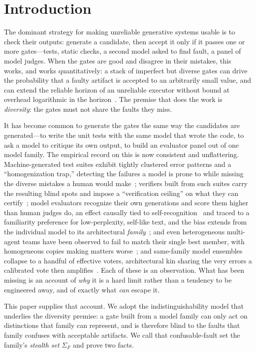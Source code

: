 \documentclass[11pt]{article}
\theoremstyle{definition}
\theoremstyle{remark}
\newcommand{\SigF}{\Sigma_{F}}
\begin{document}
\section{Introduction}
The dominant strategy for making unreliable generative systems usable is to check their outputs:
generate a candidate, then accept it only if it passes one or more gates---tests, static checks,
a second model asked to find fault, a panel of model judges. When the gates are good and disagree in
their mistakes, this works, and works quantitatively: a stack of imperfect but diverse gates can
drive the probability that a faulty artifact is accepted to an arbitrarily small
value, and can extend the reliable horizon of an unreliable executor without bound at overhead
logarithmic in the horizon~\cite{matijasevic2026}. The premise that does the work is
\emph{diversity}: the gates must not share the faults they miss.

It has become common to generate the gates the same way the candidates are generated---to write the
unit tests with the same model that wrote the code, to ask a model to critique its own output, to
build an evaluator panel out of one model family. The empirical record on this is now consistent and
unflattering. Machine-generated test suites exhibit tightly clustered error patterns and a
``homogenization trap,'' detecting the failures a model is prone to while missing the diverse
mistakes a human would make~\cite{homogenization2025}; verifiers built from such suites carry the
resulting blind spots and impose a ``verification ceiling'' on what they can
certify~\cite{verifceiling2025}; model evaluators recognize their own generations and score them
higher than human judges do, an effect causally tied to self-recognition~\cite{panickssery2024} and
traced to a familiarity preference for low-perplexity, self-like text, and the bias extends from the
individual model to its architectural \emph{family}~\cite{spiliopoulou2025}; and even heterogeneous
multi-agent teams have been observed to fail to match their single best member, with homogeneous
copies making matters worse~\cite{heteroteam2026}; and same-family model ensembles collapse to a
handful of effective voters, architectural kin sharing the very errors a calibrated vote then
amplifies~\cite{hiddenclones2026}. Each of these is an observation. What has been
missing is an account of \emph{why} it is a hard limit rather than a tendency to be engineered away,
and of exactly what \emph{can} escape it.

This paper supplies that account. We adopt the indistinguishability model that underlies the
diversity premise: a gate built from a model family can only act on distinctions that family can
represent, and is therefore blind to the faults that family confuses with acceptable artifacts. We
call that confusable-fault set the family's \emph{stealth set} $\SigF$ and prove two facts.
\end{document}
